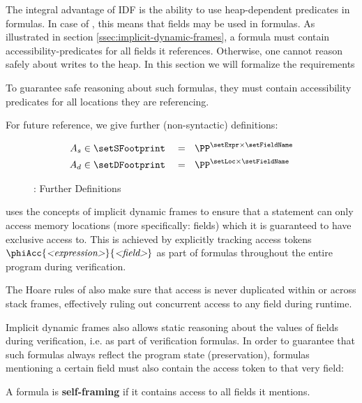 The integral advantage of IDF is the ability to use heap-dependent predicates in formulas.
In case of \svlidf, this means that fields may be used in formulas.
As illustrated in section \ref{ssec:implicit-dynamic-frames}, a formula must contain accessibility-predicates for all fields it references.
Otherwise, one cannot reason safely about writes to the heap.
In this section we will formalize the requirements 

To guarantee safe reasoning about such formulas, they must contain accessibility predicates for all locations they are referencing.



For future reference, we give further (non-syntactic) definitions:
\begin{figure}[h]
    \begin{align*}
    	A_s    & \in \setSFootprint &  & =~~ \PP^{\setExpr \times \setFieldName} \\
    	A_d    & \in \setDFootprint &  & =~~ \PP^{\setLoc \times \setFieldName} 
    \end{align*}
    \caption{\svlidf: Further Definitions}
\end{figure}


\svlidf uses the concepts of implicit dynamic frames to ensure that a statement can only access memory locations (more specifically: fields) which it is guaranteed to have exclusive access to.
This is achieved by explicitly tracking access tokens $\phiAcc{\textit{<expression>}}{\textit{<field>}}$ as part of formulas throughout the entire program during verification.
    
The Hoare rules of \svlidf also make sure that access is never duplicated within or across stack frames, effectively ruling out concurrent access to any field during runtime.

Implicit dynamic frames also allows static reasoning about the values of fields during verification, i.e. as part of verification formulas.
In order to guarantee that such formulas always reflect the program state (preservation), formulas mentioning a certain field must also contain the access token to that very field:
\begin{definition}
    A formula is \textbf{self-framing} if it contains access to all fields it mentions.
\end{definition}

